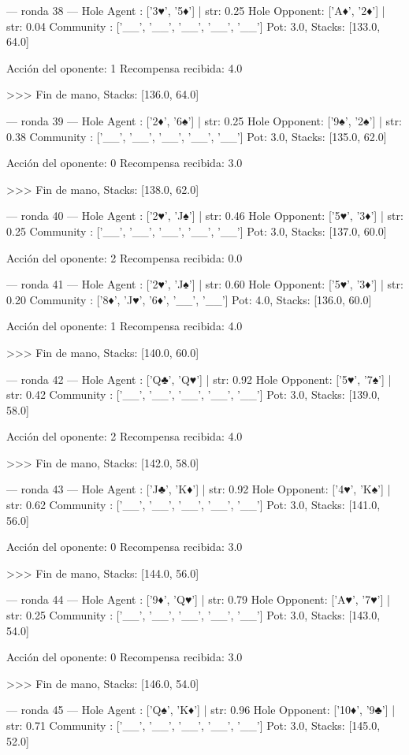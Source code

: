 --- ronda 38 ---
Hole Agent : ['3♥', '5♦'] | str: 0.25
Hole Opponent: ['A♦', '2♦'] | str: 0.04
Community  : ['__', '__', '__', '__', '__']
Pot: 3.0, Stacks: [133.0, 64.0]

Acción del oponente: 1
Recompensa recibida: 4.0

>>> Fin de mano, Stacks: [136.0, 64.0]


--- ronda 39 ---
Hole Agent : ['2♦', '6♠'] | str: 0.25
Hole Opponent: ['9♠', '2♠'] | str: 0.38
Community  : ['__', '__', '__', '__', '__']
Pot: 3.0, Stacks: [135.0, 62.0]

Acción del oponente: 0
Recompensa recibida: 3.0

>>> Fin de mano, Stacks: [138.0, 62.0]


--- ronda 40 ---
Hole Agent : ['2♥', 'J♠'] | str: 0.46
Hole Opponent: ['5♥', '3♦'] | str: 0.25
Community  : ['__', '__', '__', '__', '__']
Pot: 3.0, Stacks: [137.0, 60.0]

Acción del oponente: 2
Recompensa recibida: 0.0

--- ronda 41 ---
Hole Agent : ['2♥', 'J♠'] | str: 0.60
Hole Opponent: ['5♥', '3♦'] | str: 0.20
Community  : ['8♦', 'J♥', '6♦', '__', '__']
Pot: 4.0, Stacks: [136.0, 60.0]

Acción del oponente: 1
Recompensa recibida: 4.0

>>> Fin de mano, Stacks: [140.0, 60.0]


--- ronda 42 ---
Hole Agent : ['Q♣', 'Q♥'] | str: 0.92
Hole Opponent: ['5♥', '7♠'] | str: 0.42
Community  : ['__', '__', '__', '__', '__']
Pot: 3.0, Stacks: [139.0, 58.0]

Acción del oponente: 2
Recompensa recibida: 4.0

>>> Fin de mano, Stacks: [142.0, 58.0]


--- ronda 43 ---
Hole Agent : ['J♣', 'K♦'] | str: 0.92
Hole Opponent: ['4♥', 'K♠'] | str: 0.62
Community  : ['__', '__', '__', '__', '__']
Pot: 3.0, Stacks: [141.0, 56.0]

Acción del oponente: 0
Recompensa recibida: 3.0

>>> Fin de mano, Stacks: [144.0, 56.0]


--- ronda 44 ---
Hole Agent : ['9♦', 'Q♥'] | str: 0.79
Hole Opponent: ['A♥', '7♥'] | str: 0.25
Community  : ['__', '__', '__', '__', '__']
Pot: 3.0, Stacks: [143.0, 54.0]

Acción del oponente: 0
Recompensa recibida: 3.0

>>> Fin de mano, Stacks: [146.0, 54.0]


--- ronda 45 ---
Hole Agent : ['Q♠', 'K♦'] | str: 0.96
Hole Opponent: ['10♦', '9♣'] | str: 0.71
Community  : ['__', '__', '__', '__', '__']
Pot: 3.0, Stacks: [145.0, 52.0]

